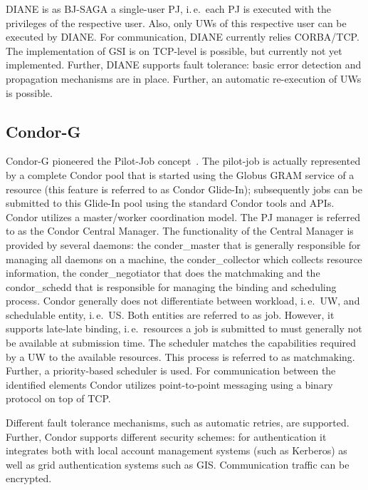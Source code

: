 \documentclass[conference,final]{IEEEtran}
\begin{document}
DIANE is as BJ-SAGA a single-user PJ, i.\,e.\ each PJ is executed with the
privileges of the respective user. Also, only UWs of this respective user can be
executed by DIANE. For communication, DIANE currently relies CORBA/TCP. The 
implementation of GSI is on TCP-level is possible, but currently not yet 
implemented. Further, DIANE supports fault tolerance: basic error detection and propagation mechanisms are in place. Further, an automatic re-execution of UWs is possible.


\subsection{Condor-G}

Condor-G pioneered the Pilot-Job concept~\cite{condor-g}. The pilot-job is
actually represented by a complete Condor pool that is started using the Globus
GRAM service of a resource (this feature is referred to as Condor Glide-In);
subsequently jobs can be submitted to this Glide-In pool using the standard
Condor tools and APIs. Condor utilizes a master/worker coordination model. The
PJ manager is referred to as the Condor Central Manager. The functionality of
the Central Manager is provided by several daemons: the conder\_master that is
generally responsible for managing all daemons on a machine, the
conder\_collector which collects resource information, the conder\_negotiator
that does the matchmaking and the condor\_schedd that is responsible for
managing the binding and scheduling process. Condor generally does not
differentiate between workload, i.\,e.\ UW, and schedulable entity, i.\,e.\ US.
Both entities are referred to as job. However, it supports late-late binding,
i.\,e.\ resources a job is submitted to must generally not be available at
submission time. The scheduler matches the capabilities required by a UW to the
available resources. This process is referred to as matchmaking. Further, a
priority-based scheduler is used. For communication between the identified
elements Condor utilizes point-to-point messaging using a binary protocol on top
of TCP.

Different fault tolerance mechanisms, such as automatic retries, are supported.
Further, Condor supports different security schemes: for authentication it
integrates both with local account management systems (such as Kerberos) as well
as grid authentication systems such as GIS. Communication traffic can be
encrypted.
\end{document}
